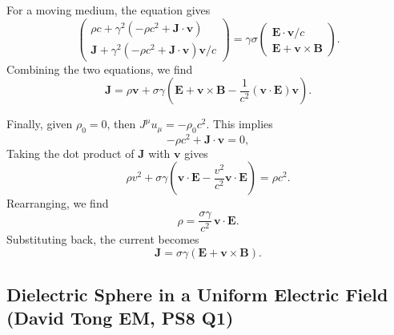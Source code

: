 For a moving medium, the equation gives
\begin{equation}
    \begin{pmatrix}
        \rho c+\gamma^2(-\rho c^2+\mathbf{J}\cdot\mathbf{v})\\
        \mathbf{J} +\gamma^2(-\rho c^2+\mathbf{J}\cdot\mathbf{v})\mathbf{v}/c
    \end{pmatrix}  =\gamma \sigma\begin{pmatrix}
        \mathbf{E}\cdot\mathbf{v}/c\\\mathbf{E}+\mathbf{v}\times\mathbf{B} \end{pmatrix}.
\end{equation}
Combining the two equations, we find
\begin{equation}
    \mathbf{J} = \rho\mathbf{v} + \sigma\gamma\!\left(\mathbf{E}
  + \mathbf{v}\times\mathbf{B} - \frac{1}{c^2}(\mathbf{v}\cdot\mathbf{E})\mathbf{v}\right).
\end{equation}

Finally, given $\rho_0 = 0$, then $J^\mu u_\mu = -\rho_0 c^2$. This implies
\begin{equation}
    -\rho c^2 + \mathbf{J}\cdot\mathbf{v} = 0,
\end{equation}
Taking the dot product of $\mathbf{J}$
with $\mathbf{v}$ gives
\begin{equation}
    \rho v^2 + \sigma\gamma\left(\mathbf{v}\cdot\mathbf{E} - \frac{v^2}{c^2}\mathbf{v}\cdot\mathbf{E}\right)
    = \rho c^2.
\end{equation}
Rearranging, we find
\begin{equation}
    \rho = \frac{\sigma \gamma}{c^2}\,\mathbf{v}\cdot\mathbf{E}.
\end{equation}
Substituting back, the current becomes
\begin{equation}
    \mathbf{J}
    = \sigma\gamma\left(\mathbf{E}+\mathbf{v}\times\mathbf{B}\right).
\end{equation}

\subsection{Dielectric Sphere in a Uniform Electric Field (David Tong EM, PS8 Q1)}
\label{sec:dielectric-sphere}

